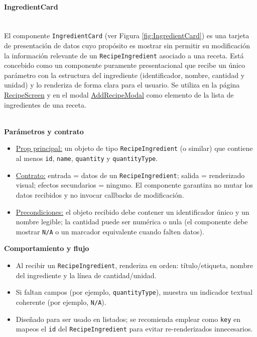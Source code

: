 \documentclass[twoside, openright, 11pt]{report}
\begin{document}
					
					\paragraph{IngredientCard\\\\}
					\label{subsec:ingredientcard}
					
					El componente \texttt{IngredientCard} (ver Figura \ref{fig:IngredientCard}) es una tarjeta de presentación de datos cuyo propósito es mostrar sin permitir su modificación la información relevante de un \texttt{RecipeIngredient} asociado a una receta. Está concebido como un componente puramente presentacional que recibe un único parámetro con la estructura del ingrediente (identificador, nombre, cantidad y unidad) y lo renderiza de forma clara para el usuario. Se utiliza en la página \hyperref[RecipeScreen]{RecipeScreen} y en el modal \hyperref[AddRecipeModal]{AddRecipeModal} como elemento de la lista de ingredientes de una receta.

					
					\textbf{\\Parámetros y contrato\\}
					\begin{itemize}
						\item \underline{Prop principal:} un objeto de tipo \texttt{RecipeIngredient} (o similar) que contiene al menos \texttt{id}, \texttt{name}, \texttt{quantity} y \texttt{quantityType}.
						
						\item \underline{Contrato:} entrada = datos de un \texttt{RecipeIngredient}; salida = renderizado visual; efectos secundarios = ninguno. El componente garantiza no mutar los datos recibidos y no invocar callbacks de modificación.
						
						\item \underline{Precondiciones:} el objeto recibido debe contener un identificador único y un nombre legible; la cantidad puede ser numérica o nula (el componente debe mostrar \texttt{N/A} o un marcador equivalente cuando falten datos).
					\end{itemize}
					
					\textbf{Comportamiento y flujo\\}
					\begin{itemize}
						\item Al recibir un \texttt{RecipeIngredient}, renderiza en orden: título/etiqueta, nombre del ingrediente y la línea de cantidad/unidad.
						\item Si faltan campos (por ejemplo, \texttt{quantityType}), muestra un indicador textual coherente (por ejemplo, \texttt{N/A}).
						\item Diseñado para ser usado en listados; se recomienda emplear como \texttt{key} en mapeos el \texttt{id} del \texttt{RecipeIngredient} para evitar re-renderizados innecesarios.
					\end{itemize}
					
\end{document}
